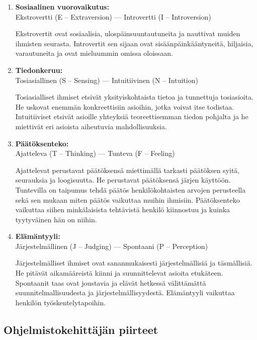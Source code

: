 \documentclass[finnish]{../tktltiki2}
\theoremstyle{definition}
\theoremstyle{remark}
\begin{document}
\begin{enumerate}

\item {\bf Sosiaalinen vuorovaikutus:}\\ Ekstrovertti (E -- Extraversion) --- Introvertti (I -- Introversion)

Ekstrovertit ovat sosiaalisia, ulospäinsuuntautuneita ja nauttivat
muiden ihmisten seurasta. Introvertit sen sijaan ovat sisäänpäinkääntyneitä, hiljaisia, varautuneita ja ovat mieluummin omissa oloissaan.

\item {\bf Tiedonkeruu:}\\ Tosiasiallinen (S -- Sensing) --- Intuitiivinen (N -- Intuition)

Tosiasialliset ihmiset etsivät yksityiskohtaista tietoa ja tunnettuja
tosiasioita. He uskovat enemmän konkreettisiin asioihin, jotka
voivat itse todistaa. Intuitiiviset etsivät asioille
yhteyksiä teoreettisemman tiedon pohjalta ja
he miettivät eri asioista aiheutuvia mahdollisuuksia.

\pagebreak

\item {\bf Päätöksenteko:}\\ Ajatteleva (T -- Thinking) --- Tunteva (F -- Feeling)

Ajattelevat perustavat päätöksensä miettimällä tarkasti päätöksen syitä, seurauksia ja loogisuutta. He perustavat päätöksensä järjen käyttöön. Tuntevilla on taipumus tehdä päätös
henkilökohtaisten arvojen perusteella sekä sen mukaan miten päätös
vaikuttaa muihin ihmisiin. Päätöksenteko vaikuttaa siihen minkälaisista tehtävistä
henkilö kiinnostuu ja kuinka tyytyväinen hän on niihin.

\item {\bf Elämäntyyli:}\\ Järjestelmällinen (J -- Judging) --- Spontaani (P -- Perception)

Järjestelmälliset ihmiset ovat sananmukaisesti järjestelmällisiä
ja täsmäl\-lisiä. He pitävät aikamääreistä kiinni ja suunnittelevat
asioita etukäteen. Spontaanit taas ovat joustavia ja elävät
hetkessä välittämättä suunnitelmallisuudesta ja järjestelmällisyydestä.
Elämäntyyli vaikuttaa henkilön työskentelytapoihin.

\end{enumerate}

\subsection{Ohjelmistokehittäjän piirteet}
\end{document}
